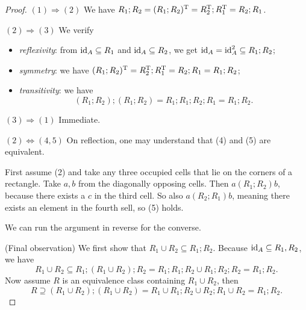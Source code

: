 \begin{proof}
$(1)\Rightarrow (2)$ We have $R_1;R_2 = (R_1;R_2)^{\mathrm{T}} = R_2^{\mathrm{T}}; R_1^{\mathrm{T}} = R_2;R_1$.

$(2)\Rightarrow (3)$ We verify
\begin{itemize}
\item \emph{reflexivity}: from $\operatorname{id}_A \subseteq R_1$ and $\operatorname{id}_A \subseteq R_2$, we get $\operatorname{id}_A = \operatorname{id}_A^2 \subseteq R_1;R_2$;
\item \emph{symmetry}: we have $(R_1;R_2)^{\mathrm{T}} = R_2^{\mathrm{T}}; R_1^{\mathrm{T}} = R_2;R_1 = R_1;R_2$;
\item \emph{transitivity}: we have
\[ (R_1;R_2);(R_1; R_2) = R_1;R_1;R_2;R_1 = R_1;R_2. \]
\end{itemize}

$(3)\Rightarrow (1)$ Immediate.

$(2)\Leftrightarrow (4, 5)$ On reflection, one may understand that (4) and (5) are equivalent.

First assume (2) and take any three occupied cells that lie on the corners of a rectangle. Take $a,b$ from the diagonally opposing cells. Then $a(R_1;R_2)b$, because there exists a $c$ in the third cell. So also $a(R_2;R_1)b$, meaning there exists an element in the fourth sell, so (5) holds.

We can run the argument in reverse for the converse.

(Final observation) We first show that $R_1\cup R_2 \subseteq R_1;R_2$. Because $\operatorname{id}_A \subseteq R_1, R_2$, we have
\[ R_1\cup R_2 \subseteq R_1;(R_1\cup R_2);R_2 = R_1;R_1;R_2 \cup R_1;R_2;R_2 = R_1;R_2. \]
Now assume $R$ is an equivalence class containing $R_1\cup R_2$, then
\[ R \supseteq (R_1\cup R_2);(R_1\cup R_2) = R_1 \cup R_1;R_2 \cup R_2;R_1 \cup R_2 = R_1;R_2. \]
\end{proof}

